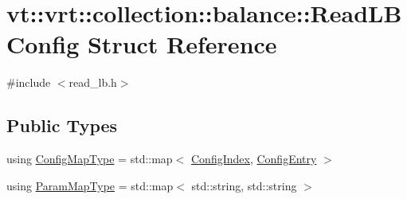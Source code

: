 \hypertarget{structvt_1_1vrt_1_1collection_1_1balance_1_1_read_l_b_config}{}\section{vt\+:\+:vrt\+:\+:collection\+:\+:balance\+:\+:Read\+L\+B\+Config Struct Reference}
\label{structvt_1_1vrt_1_1collection_1_1balance_1_1_read_l_b_config}


{\ttfamily \#include $<$read\+\_\+lb.\+h$>$}

\subsection*{Public Types}
\begin{DoxyCompactItemize}
\item 
using \hyperlink{structvt_1_1vrt_1_1collection_1_1balance_1_1_read_l_b_config_ad7babe539cf2171b9a9cee642b36a965}{Config\+Map\+Type} = std\+::map$<$ \hyperlink{namespacevt_1_1vrt_1_1collection_1_1balance_ac1bb9eee8129549177880dbb4e5f6a34}{Config\+Index}, \hyperlink{structvt_1_1vrt_1_1collection_1_1balance_1_1_config_entry}{Config\+Entry} $>$
\item 
using \hyperlink{structvt_1_1vrt_1_1collection_1_1balance_1_1_read_l_b_config_a539bba2e8e767f2aa9923c6616088404}{Param\+Map\+Type} = std\+::map$<$ std\+::string, std\+::string $>$
\end{DoxyCompactItemize}
